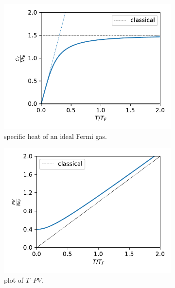 \begin{itemize}
	\begin{figure}[H]
		\centering
		\begin{subfigure}{0.4\linewidth}
			\centering
			\includegraphics[scale=0.65]{figures/specific heat of an ideal Fermi gas.pdf}
			\caption{specific heat of an ideal Fermi gas.}
			\label{figure 8.2 (a)}
		\end{subfigure}
		\begin{subfigure}{0.4\linewidth}
			\centering
			\includegraphics[scale=0.65]{figures/plot of T--PV (Fermi).pdf}
			\caption{plot of $T$--$P V$.}
		\end{subfigure}
		\caption{}
	\end{figure}
\end{itemize}

